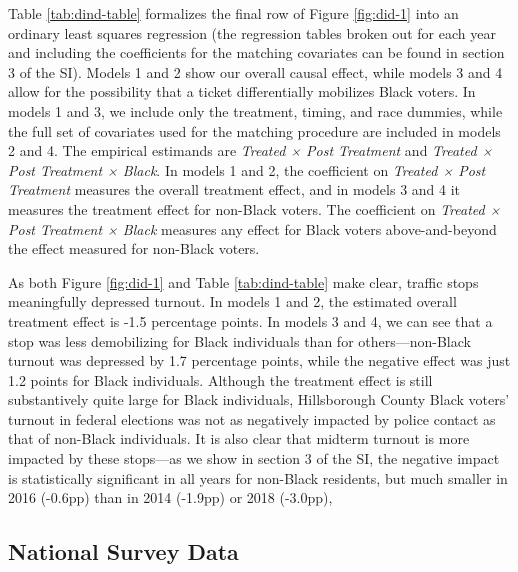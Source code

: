 \documentclass[
  12pt,
]{article}
\begin{document}
Table \ref{tab:dind-table} formalizes the final row of Figure \ref{fig:did-1} into an ordinary least squares regression (the regression tables broken out for each year and including the coefficients for the matching covariates can be found in section 3 of the SI). Models 1 and 2 show our overall causal effect, while models 3 and 4 allow for the possibility that a ticket differentially mobilizes Black voters. In models 1 and 3, we include only the treatment, timing, and race dummies, while the full set of covariates used for the matching procedure are included in models 2 and 4. The empirical estimands are \emph{Treated × Post Treatment} and \emph{Treated × Post Treatment × Black}. In models 1 and 2, the coefficient on \emph{Treated × Post Treatment} measures the overall treatment effect, and in models 3 and 4 it measures the treatment effect for non-Black voters. The coefficient on \emph{Treated × Post Treatment × Black} measures any effect for Black voters above-and-beyond the effect measured for non-Black voters.

\begin{singlespace}

\end{singlespace}

As both Figure \ref{fig:did-1} and Table \ref{tab:dind-table} make clear, traffic stops meaningfully depressed turnout. In models 1 and 2, the estimated overall treatment effect is -1.5 percentage points. In models 3 and 4, we can see that a stop was less demobilizing for Black individuals than for others---non-Black turnout was depressed by 1.7 percentage points, while the negative effect was just 1.2 points for Black individuals. Although the treatment effect is still substantively quite large for Black individuals, Hillsborough County Black voters' turnout in federal elections was not as negatively impacted by police contact as that of non-Black individuals. It is also clear that midterm turnout is more impacted by these stops---as we show in section 3 of the SI, the negative impact is statistically significant in all years for non-Black residents, but much smaller in 2016 (-0.6pp) than in 2014 (-1.9pp) or 2018 (-3.0pp),

\hypertarget{national-survey-data-1}{%
\subsection*{National Survey Data}\label{national-survey-data-1}}
\end{document}
